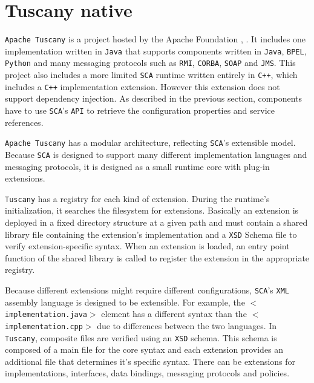 \section{Tuscany native}

\texttt{Apache Tuscany} is a project hosted by the Apache Foundation \cite{Tuscany}, \cite{Laws}. It includes one implementation written
in \texttt{Java} that supports components written in \texttt{Java}, \texttt{BPEL}, \texttt{Python} and many messaging protocols such as \texttt{RMI}, \texttt{CORBA}, \texttt{SOAP} and \texttt{JMS}.
This project also includes a more limited \texttt{SCA} runtime written entirely in \texttt{C++}, which includes a \texttt{C++} implementation extension.
However this extension does not support dependency injection. As described in the previous section, components have to use
\texttt{SCA}'s \texttt{API} to retrieve the configuration properties and service references.

\texttt{Apache Tuscany} has a modular architecture, reflecting \texttt{SCA}'s extensible model. Because \texttt{SCA} is designed to support many
different implementation languages and messaging protocols, it is designed as a small runtime core with plug-in extensions.

\texttt{Tuscany} has a registry for each kind of extension. During the runtime's initialization, it searches the filesystem for
extensions. Basically an extension is deployed in a fixed directory structure at a given path and must contain a shared
library file containing the extension's implementation and a \texttt{XSD} Schema file to verify extension-specific syntax.
When an extension is loaded, an entry point function of the shared library is called to register the extension in
the appropriate registry.

Because different extensions might require different configurations, \texttt{SCA}'s \texttt{XML} assembly language is designed to be extensible.
For example, the \texttt{$<$implementation.java$>$} element has a different syntax than the \texttt{$<$implementation.cpp$>$}
due to differences between the two languages. In \texttt{Tuscany}, composite files are verified using an \texttt{XSD} schema. This schema is
composed of a main file for the core syntax and each extension provides an additional file that determines it's specific syntax.
There can be extensions for implementations, interfaces, data bindings, messaging protocols and policies.



